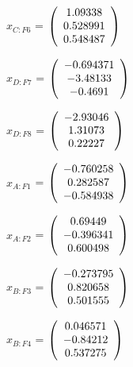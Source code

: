 \begin{description}
$x_{C:F6}$ = $\left( \begin{array} {ccc}    1.09338 \\   0.528991 \\   0.548487 
\end{array} \right)\\ \\$

$x_{D:F7}$ = $\left( \begin{array} {ccc}  -0.694371 \\   -3.48133 \\    -0.4691 
\end{array} \right)\\ \\$

$x_{D:F8}$ = $\left( \begin{array} {ccc}   -2.93046 \\    1.31073 \\    0.22227 
\end{array} \right)\\ \\$

$\hat{x}_{A:F1}$ = $\left( \begin{array} {ccc}  -0.760258 \\   0.282587 \\  -0.584938 
\end{array} \right)\\ \\$

$\hat{x}_{A:F2}$ = $\left( \begin{array} {ccc}    0.69449 \\  -0.396341 \\   0.600498 
\end{array} \right)\\ \\$

$\hat{x}_{B:F3}$ = $\left( \begin{array} {ccc}  -0.273795 \\   0.820658 \\   0.501555 
\end{array} \right)\\ \\$

$\hat{x}_{B:F4}$ = $\left( \begin{array} {ccc}   0.046571 \\   -0.84212 \\   0.537275 
\end{array} \right)\\ \\$


\end{description}
